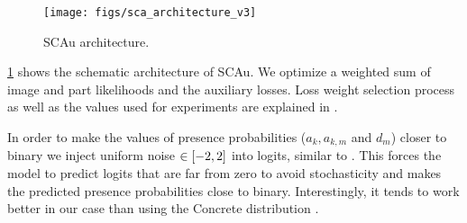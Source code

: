 \begin{figure}
    \centering
    \texttt{[image: figs/sca\_architecture\_v3]}
    \caption{\gls{SCAu} architecture.}
    \label{fig:sca_arch}
\end{figure}
\cref{fig:sca_arch} shows the schematic architecture of \gls{SCAu}. We optimize a weighted sum of image and part likelihoods and the auxiliary losses. 
Loss weight selection process as well as the values used for experiments are explained in .

In order to make the values of presence probabilities ($a_k, a_{k,m}$ and $d_m$) closer to binary we inject uniform noise $\in {\left[-2, 2\right]}$ into logits, similar to \cite{Tieleman2014thesis}.
This forces the model to predict logits that are far from zero to avoid stochasticity and makes the predicted presence probabilities close to binary.
Interestingly, it tends to work better in our case than using the Concrete distribution \citep{Maddison2017concrete}.